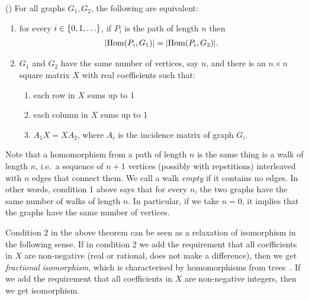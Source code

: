 \begin{theorem}\label{thm:grohe}(\cite[Theorem 2]{groheDellRattan2018})
    For all graphs $G_1,G_2$, the following  are equivalent:
    \begin{enumerate}
        \item for every $i \in \{0,1,\ldots\}$, if $P_i$ is the path of length $n$ then
        \begin{align*}
        |\mathrm {Hom}(P_i,G_1) | = |\mathrm {Hom}(P_i,G_2)|.
        \end{align*}
        \item $G_1$ and $G_2$  have the same number of vertices, say $n$, and there is an $n \times n$ square matrix $X$ with real coefficients such that:
        \begin{enumerate}
            \item each row in $X$ sums up to 1
            \item each column in $X$ sums up to 1
            \item $A_1 X = X A_2$, where $A_i$ is the incidence matrix of graph $G_i$.
        \end{enumerate}
    \end{enumerate}
\end{theorem}
Note that a homomorphism from a path of length $n$ is the same thing is a walk of length $n$, i.e.~a sequence of $n+1$ vertices (possibly with repetitions) interleaved with $n$ edges that connect them. We call a walk \emph{empty} if it contains no edges. In other words, condition 1 above says that for every $n$, the two graphs have the same number of walks of length $n$. In particular, if we take $n=0$, it implies that the graphs have the same number of vertices.     

Condition 2 in the above theorem can be seen as a relaxation of isomorphism in the following sense. 
If in condition 2 we add the requirement that all coefficients in $X$ are non-negative (real or rational, does not make a difference), then we get  \emph{fractional isomorphism}, which is characterised by homomorphisms from trees~\cite[Theorem 1]{groheDellRattan2018}. If we add the requirement that all coefficients in $X$ are non-negative integers, then we get isomorphism.  

